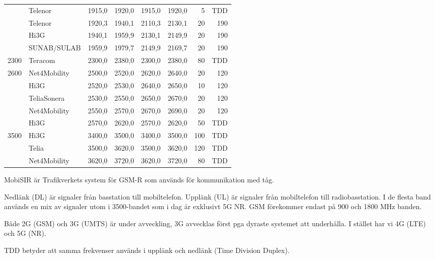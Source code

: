 \begin{longtable}{rlrrrrrr}
        & Telenor                & 1915,0 & 1920,0 & 1915,0 & 1920,0 & 5   & TDD \\
        & Telenor                & 1920,3 & 1940,1 & 2110,3 & 2130,1 & 20  & 190 \\
        & Hi3G                   & 1940,1 & 1959,9 & 2130,1 & 2149,9 & 20  & 190 \\
        & SUNAB/SULAB            & 1959,9 & 1979,7 & 2149,9 & 2169,7 & 20  & 190 \\ \hline
2300 	& Teracom	         & 2300,0 & 2380,0 & 2300,0 & 2380,0 & 80  & TDD \\ \hline
2600    & Net4Mobility           & 2500,0 & 2520,0 & 2620,0 & 2640,0 & 20  & 120 \\
        & Hi3G                   & 2520,0 & 2530,0 & 2640,0 & 2650,0 & 10  & 120 \\
        & TeliaSonera            & 2530,0 & 2550,0 & 2650,0 & 2670,0 & 20  & 120 \\
        & Net4Mobility           & 2550,0 & 2570,0 & 2670,0 & 2690,0 & 20  & 120 \\
        & Hi3G                   & 2570,0 & 2620,0 & 2570,0 & 2620,0 & 50  & TDD \\ \hline
3500    & Hi3G                   & 3400,0 & 3500,0 & 3400,0 & 3500,0 & 100 & TDD \\
        & Telia                  & 3500,0 & 3620,0 & 3500,0 & 3620,0 & 120 & TDD \\
        & Net4Mobility           & 3620,0 & 3720,0 & 3620,0 & 3720,0 & 80  & TDD 
\end{longtable}

MobiSIR är Trafikverkets system för GSM-R som används för
kommunikation med tåg.

Nedlänk (DL) är signaler från basstation till mobiltelefon. Upplänk
(UL) är signaler från mobiltelefon till radiobasstation. I de flesta
band används en mix av signaler utom i 3500-bandet som i dag är
exklusivt 5G NR. GSM förekommer endast på 900 och 1800 MHz banden.

Både 2G (GSM) och 3G (UMTS) är under avveckling, 3G avvecklas först
pga dyraste systemet att underhålla. I stället har vi 4G (LTE) och 5G
(NR).

TDD betyder att samma frekvenser används i upplänk och nedlänk (Time
Division Duplex).






